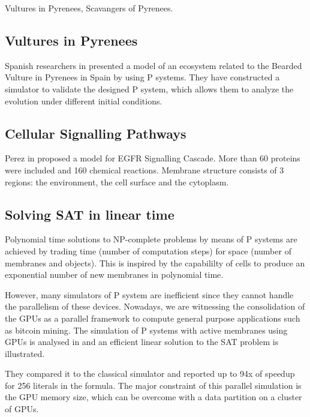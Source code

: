 Vultures in Pyrenees, Scavangers of Pyrenees.

\subsection{Vultures in Pyrenees} %
\label{sub:vultures_in_pyrenees}

Spanish researchers in \cite{Cardona:2009:Vultures} presented a model of an ecosystem related to the Bearded Vulture in Pyrenees in Spain by using P systems. They have constructed a simulator to validate the designed P system, which allows them to analyze the evolution under different initial conditions.


\subsection{Cellular Signalling Pathways} %
\label{sub:cellular_signalling_pathways}

Perez in \cite{Perez06EGFR} proposed a model for EGFR Signalling Cascade. More than 60 proteins were included and 160 chemical reactions. Membrane structure consists of 3 regions: the environment, the cell surface and the cytoplasm. 


\subsection{Solving SAT in linear time} %
\label{sub:solving_sat_in_linear_time}


Polynomial time solutions to NP-complete problems by means of P systems are achieved by trading time (number of computation steps) for space (number of membranes and objects). This is inspired by the capabililty of cells to produce an exponential number of new membranes in polynomial time.

However, many simulators of P system are inefficient since they cannot handle the parallelism of these devices. Nowadays, we are witnessing the consolidation of the GPUs as a parallel framework to compute general purpose applications such as bitcoin mining. The simulation of P systems with active membranes using GPUs is analysed in \cite{Cecilia10SAT} and an efficient linear solution to the SAT problem is illustrated.

They compared it to the classical simulator and reported up to 94x of speedup for 256 literals in the formula. The major constraint of this parallel simulation is the GPU memory size, which can be overcome with a data partition on a cluster of GPUs. 

